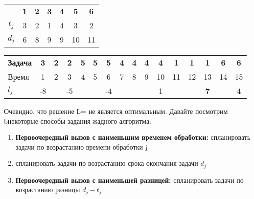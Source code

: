 \vspace{\baselineskip}
\begin{tabular}{ccccccc}
\multicolumn{1}{c}{\textbf{}} &
\multicolumn{1}{c}{\textbf{1}} & \multicolumn{1}{c}{\textbf{2}} & \multicolumn{1}{c}{\textbf{3}} & \multicolumn{1}{c}{\textbf{4}} &
\multicolumn{1}{c}{\textbf{5}} &
\multicolumn{1}{c}{\textbf{6}} \\[5pt]
\ttfamily $t_j$ & 3 & 2 & 1 & 4 & 3 & 2\\[5pt]
\ttfamily $d_j$ & 6 & 8 & 9 & 9 & 10 & 11\\[5pt]
\end{tabular}

\vspace{\baselineskip}
\begin{tabular}{lccccccccccccccc}
\multicolumn{1}{l}{\textbf{Задача}} & \multicolumn{1}{c}{\textbf{3}} & \multicolumn{1}{c}{\textbf{2}} & \multicolumn{1}{c}{\textbf{2}} &
\multicolumn{1}{c}{\textbf{5}} &
\multicolumn{1}{c}{\textbf{5}} &
\multicolumn{1}{c}{\textbf{5}} &
\multicolumn{1}{c}{\textbf{4}} &
\multicolumn{1}{c}{\textbf{4}} &
\multicolumn{1}{c}{\textbf{4}} &
\multicolumn{1}{c}{\textbf{4}} &
\multicolumn{1}{c}{\textbf{1}} &
\multicolumn{1}{c}{\textbf{1}} &
\multicolumn{1}{c}{\textbf{1}} &
\multicolumn{1}{c}{\textbf{6}} &
\multicolumn{1}{c}{\textbf{6}}\\[5pt]
\ttfamily Время & 1 & 2 & 3 & 4 & 5 & 6 & 7 & 8 & 9 & 10 & 11 & 12 & 13 & 14 & 15\\[5pt]
\ttfamily $l_j$ & -8 & \ & -5 & \ & \ & -4 & \ & \ & \ & 1 & \ & \ & \textbf{7} & \ & 4\\[5pt]
\end{tabular}

\vspace{\baselineskip}
Очевидно, что решение L={\color{Purple}{7}} не является оптимальным. Давайте посмотрим bнекоторые способы задания жадного алгоритма:

\vspace{\baselineskip}
\begin{enumerate}
    \item \textbf{Первоочередный вызов с наименьшим временем обработки:} спланировать задачи по возрастанию времени обработки j
    \item \textbf{\textbf{}} спланировать задачи по возрастанию срока окончания задачи $d_j$
    \item \textbf{Первоочередный вызов с наименьшей разницей:} спланировать задачи по возрастанию разницы $d_j - t_j$
\end{enumerate}

